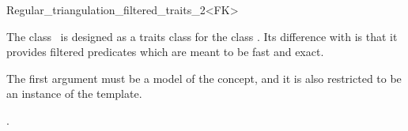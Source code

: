 

\begin{ccRefClass}{Regular_triangulation_filtered_traits_2<FK>}

\ccDefinition
  
The class \ccRefName\ is designed as a traits class for the
class . 
Its difference with  is that it
provides filtered predicates which are meant to be fast and exact.

The first argument  must be a model of the  concept, and
it is also restricted to be an instance of the  template.


\ccIsModel
{}


\ccSeeAlso

.

\end{ccRefClass}

